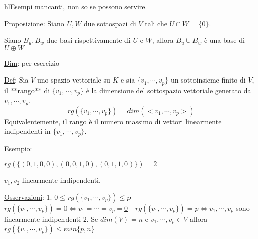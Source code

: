 \documentclass{article}
\begin{document}
hl{Esempi mancanti, non so se possono servire}.

\ul{Proposizione}: Siano $U,W$ due sottospazi di $V$ tali che $U\cap W=\{$\ul{0}$\}$.

Siano $B_u,B_w$ due basi rispettivamente di $U$ e $W$, allora $B_u\cup B_w$ è una base di $U\oplus W$

\ul{Dim}: per esercizio

\ul{Def}: Sia $V$ uno spazio vettoriale su $K$ e sia $\{v_1,\cdots,v_p\}$ un sottoinsieme finito di $V$, il **rango** di $\{v_1,\cdots,v_p\}$ è la dimensione del sottospazio vettoriale generato da $v_1,\cdots,v_p$.
$$rg(\{v_1,\cdots,v_p\})=dim(<v_1,\cdots,v_p>)$$
Equivalentemente, il rango è il numero massimo di vettori linearmente indipendenti in $\{v_1,\cdots,v_p\}$.

\ul{Esempio}:

$rg(\{(0,1,0,0),(0,0,1,0),(0,1,1,0)\})=2$

$v_1,v_2$ linearmente indipendenti.

\ul{Osservazioni}:
1. $0\leq rg(\{v_1,\cdots,v_p\})\leq p$
    - $rg(\{v_1,\cdots,v_p\})=0\Leftrightarrow v_1=\cdots=v_p=$\ul{0}
    - $rg(\{v_1,\cdots,v_p\})=p\Leftrightarrow v_1,\cdots,v_p$ sono linearmente indipendenti
2. Se $dim(V)=n$ e $v_1,\cdots,v_p\in V$ allora $rg(\{v_1,\cdots,v_p\})\leq min\{p,n\}$
\end{document}
